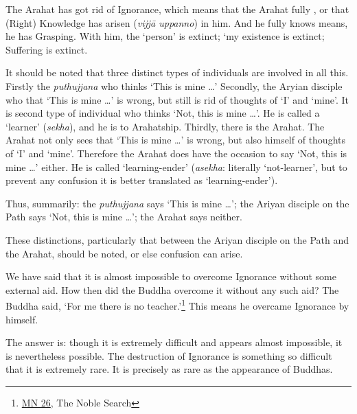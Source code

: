 The Arahat has got rid of Ignorance, which means that the Arahat fully , or that (Right) Knowledge has arisen (\emph{vijjā uppanno}) in him. And he fully knows means, he has  Grasping. With him, the `person' is extinct; `my existence is extinct; Suffering is extinct.

It should be noted that three distinct types of individuals are involved in all this. Firstly the \emph{puthujjana} who thinks `This is mine \ldots\hspace{0pt}' Secondly, the Aryian disciple who  that `This is mine \ldots\hspace{0pt}' is wrong, but still is  rid of thoughts of `I' and `mine'. It is  second type of individual who thinks `Not, this is mine \ldots\hspace{0pt}'. He is called a `learner' (\emph{sekha}), and he is  to Arahatship. Thirdly, there is the Arahat. The Arahat not only sees that `This is mine \ldots\hspace{0pt}' is wrong, but also  himself of thoughts of `I' and `mine'. Therefore the Arahat does  have the occasion to say `Not, this is mine \ldots\hspace{0pt}' either. He is called `learning-ender' (\emph{asekha}: literally `not-learner', but to prevent any confusion it is better translated as `learning-ender').

Thus, summarily: the \emph{puthujjana} says `This is mine \ldots\hspace{0pt}'; the Ariyan disciple on the Path says `Not, this is mine \ldots\hspace{0pt}'; the Arahat says neither.

These distinctions, particularly that between the Ariyan disciple on the Path and the Arahat, should be noted, or else confusion can arise.

We have said that it is almost impossible to overcome Ignorance without some external aid. How then did the Buddha overcome it without any such aid? The Buddha said, `For me there is no teacher.'\footnote{\href{https://suttacentral.net/mn26/en/bodhi}{MN 26}, The Noble Search} This means he overcame Ignorance by himself.

The answer is: though it is extremely difficult and appears almost impossible, it is nevertheless possible. The destruction of Ignorance  is something so difficult that it is extremely rare. It is precisely as rare as the appearance of Buddhas.
